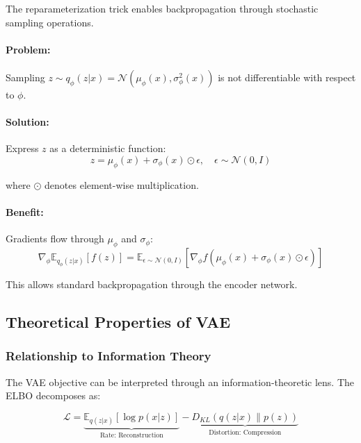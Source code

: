 \documentclass[conference]{IEEEtran}
\begin{document}
The reparameterization trick enables backpropagation through stochastic sampling operations.

\paragraph{Problem:} Sampling $z \sim q_\phi(z|x) = \mathcal{N}(\mu_\phi(x), \sigma_\phi^2(x))$ is not differentiable with respect to $\phi$.

\paragraph{Solution:} Express $z$ as a deterministic function:
\begin{equation}
z = \mu_\phi(x) + \sigma_\phi(x) \odot \epsilon, \quad \epsilon \sim \mathcal{N}(0, I)
\end{equation}

where $\odot$ denotes element-wise multiplication.

\paragraph{Benefit:} Gradients flow through $\mu_\phi$ and $\sigma_\phi$:
\begin{equation}
\nabla_\phi \mathbb{E}_{q_\phi(z|x)}[f(z)] = \mathbb{E}_{\epsilon \sim \mathcal{N}(0,I)}[\nabla_\phi f(\mu_\phi(x) + \sigma_\phi(x) \odot \epsilon)]
\end{equation}

This allows standard backpropagation through the encoder network.

\subsection{Theoretical Properties of VAE}

\subsubsection{Relationship to Information Theory}

The VAE objective can be interpreted through an information-theoretic lens. The ELBO decomposes as:

\begin{equation}
\mathcal{L} = \underbrace{\mathbb{E}_{q(z|x)}[\log p(x|z)]}_{\text{Rate: Reconstruction}} - \underbrace{D_{KL}(q(z|x) \| p(z))}_{\text{Distortion: Compression}}
\end{equation}
\end{document}
